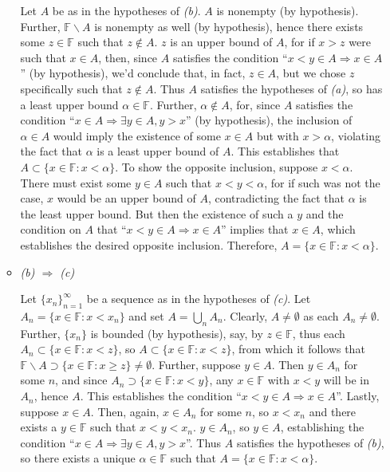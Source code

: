 \documentclass{article}
\begin{document}
\begin{enumerate}
\begin{itemize}
Let \(A\) be as in the hypotheses of {\em (b)}.  \(A\) is nonempty (by hypothesis).  Further, \(\mathbb{F} \backslash A\) is nonempty as well (by hypothesis), hence there exists some \(z \in \mathbb{F}\) such that \(z \notin A\).  \(z\) is an upper bound of \(A\), for if \(x > z\) were such that \(x \in A\), then, since \(A\) satisfies the condition ``\(x < y \in A \Rightarrow x \in A\)'' (by hypothesis), we'd conclude that, in fact, \(z \in A\), but we chose \(z\) specifically such that \(z \notin A\).  Thus \(A\) satisfies the hypotheses of {\em (a)}, so has a least upper bound \(\alpha \in \mathbb{F}\).  Further, \(\alpha \notin A\), for, since \(A\) satisfies the condition ``\(x \in A \Rightarrow \exists y \in A, y > x\)'' (by hypothesis), the inclusion of \(\alpha \in A\) would imply the existence of some \(x \in A\) but with \(x > \alpha\), violating the fact that \(\alpha\) is a least upper bound of \(A\).  This establishes that \(A \subset \{x \in \mathbb{F} : x < \alpha\}\).  To show the opposite inclusion, suppose \(x < \alpha\).  There must exist some \(y \in A\) such that \(x < y < \alpha\), for if such was not the case, \(x\) would be an upper bound of \(A\), contradicting the fact that \(\alpha\) is the least upper bound.  But then the existence of such a \(y\) and the condition on \(A\) that ``\(x < y \in A \Rightarrow x \in A\)'' implies that \(x \in A\), which establishes the desired opposite inclusion.  Therefore, \(A = \{x \in \mathbb{F} : x < \alpha\}\).

\item {\em (b) \(\Rightarrow\) (c)}

Let \(\{x_n\}_{n = 1}^{\infty}\) be a sequence as in the hypotheses of {\em (c)}.  Let \(A_n = \{x \in \mathbb{F} : x < x_n\}\) and set \(A = \bigcup_n A_n\).  Clearly, \(A \neq \emptyset\) as each \(A_n \neq \emptyset\).  Further, \(\{x_n\}\) is bounded (by hypothesis), say, by \(z \in \mathbb{F}\), thus each \(A_n \subset \{x \in \mathbb{F} : x < z\}\), so \(A \subset \{x \in \mathbb{F} : x < z\}\), from which it follows that \(\mathbb{F} \backslash A \supset \{x \in \mathbb{F} : x \geq z\} \neq \emptyset\).  Further, suppose \(y \in A\).  Then \(y \in A_n\) for some \(n\), and since \(A_n \supset \{x \in \mathbb{F} : x < y\}\), any \(x \in \mathbb{F}\) with \(x < y\) will be in \(A_n\), hence \(A\).  This establishes the condition ``\(x < y \in A \Rightarrow x \in A\)''.  Lastly, suppose \(x \in A\).  Then, again, \(x \in A_n\) for some \(n\), so \(x < x_n\) and there exists a \(y \in \mathbb{F}\) such that \(x < y < x_n\).  \(y \in A_n\), so \(y \in A\), establishing the condition ``\(x \in A \Rightarrow \exists y \in A, y > x\)''.  Thus \(A\) satisfies the hypotheses of {\em (b)}, so there exists a unique \(\alpha \in \mathbb{F}\) such that \(A = \{x \in \mathbb{F} : x < \alpha\}\).


\end{itemize}
\end{enumerate}
\end{document}
